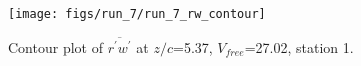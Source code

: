 \begin{figure}[H]
\centering
\texttt{[image: figs/run\_7/run\_7\_rw\_contour]}
\caption{Contour plot of $\overline{r^\prime w^\prime}$ at $z/c$=5.37, $V_{free}$=27.02, station 1.}
\label{fig:run_7_rw_contour}
\end{figure}


